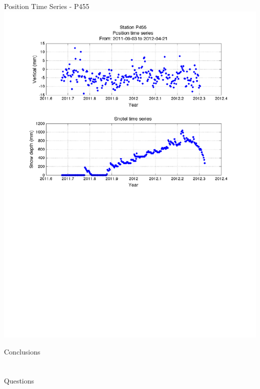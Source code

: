 \documentclass{beamer}
\begin{document}
\begin{frame}{Position Time Series - P455}
  \includegraphics[width=1\linewidth,trim=50 0 50 20, clip=true]{logan/p455_snotel.pdf}
\end{frame}

\begin{frame}{Conclusions}
\section[Conclusion]{}
\end{frame}

\begin{frame}
{
\vspace{60pt}
\huge
\centering
Questions\\}
\begin{center}
  
\end{center}
\end{frame}
\end{document}
